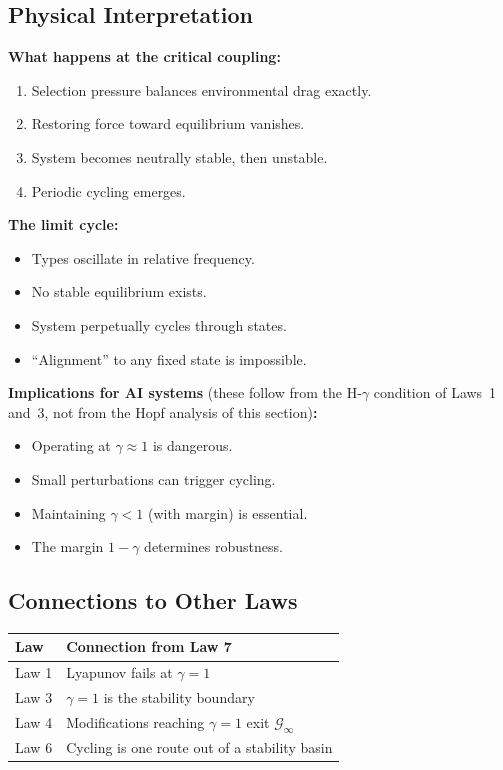 \documentclass[12pt]{article}
\begin{document}
\subsection{Physical Interpretation}

\textbf{What happens at the critical coupling:}
\begin{enumerate}
    \item Selection pressure balances environmental drag exactly.
    \item Restoring force toward equilibrium vanishes.
    \item System becomes neutrally stable, then unstable.
    \item Periodic cycling emerges.
\end{enumerate}

\textbf{The limit cycle:}
\begin{itemize}
    \item Types oscillate in relative frequency.
    \item No stable equilibrium exists.
    \item System perpetually cycles through states.
    \item ``Alignment'' to any fixed state is impossible.
\end{itemize}

\textbf{Implications for AI systems} (these follow from the H-$\gamma$ condition of Laws~1 and~3, not from the Hopf analysis of this section)\textbf{:}
\begin{itemize}
    \item Operating at $\gamma \approx 1$ is dangerous.
    \item Small perturbations can trigger cycling.
    \item Maintaining $\gamma < 1$ (with margin) is essential.
    \item The margin $1 - \gamma$ determines robustness.
\end{itemize}

\subsection{Connections to Other Laws}

\begin{center}
\begin{tabular}{ll}
\toprule
\textbf{Law} & \textbf{Connection from Law 7} \\
\midrule
Law 1 & Lyapunov fails at $\gamma = 1$ \\
Law 3 & $\gamma = 1$ is the stability boundary \\
Law 4 & Modifications reaching $\gamma = 1$ exit $\mathcal{G}_\infty$ \\
Law 6 & Cycling is one route out of a stability basin \\
\bottomrule
\end{tabular}
\end{center}
\end{document}
